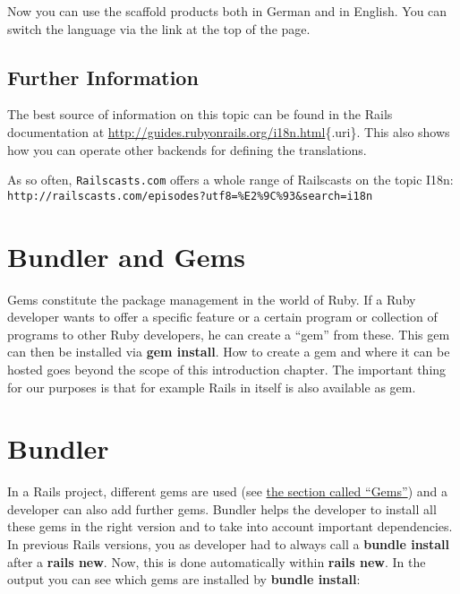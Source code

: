 \documentclass[a4paper]{book}
\newcommand{\chap}[1]{\newpage\thispagestyle{empty}\chapter{#1}\label{chap:\thechapter}}
\begin{document}
Now you can use the scaffold products both in German and in English. You can switch the language via the link at the top of the page.

\section{Further Information}\label{further-information-1}

The best source of information on this topic can be found in the Rails documentation at \url{http://guides.rubyonrails.org/i18n.html}\{.uri\}. This also shows how you can operate other backends for defining the translations.

As so often, \texttt{Railscasts.com} offers a whole range of Railscasts on the topic I18n: \texttt{http://railscasts.com/episodes?utf8=\%E2\%9C\%93\&search=i18n}

\chap{Bundler and Gems}\label{bundler-and-gems}


Gems constitute the package management in the world of Ruby. If a Ruby developer wants to offer a specific feature or a certain program or collection of programs to other Ruby developers, he can create a “gem” from these. This gem can then be installed via \textbf{gem install}. How to create a gem and where it can be hosted goes beyond the scope of this introduction chapter. The important thing for our purposes is that for example Rails in itself is also available as gem.

\chap{Bundler}\label{bundler}

In a Rails project, different gems are used (see \hyperref[gems]{the section called “Gems”}) and a developer can also add further gems. Bundler helps the developer to install all these gems in the right version and to take into account important dependencies. In previous Rails versions, you as developer had to always call a \textbf{bundle install} after a \textbf{rails new}. Now, this is done automatically within \textbf{rails new}. In the output you can see which gems are installed by \textbf{bundle install}:
\end{document}
